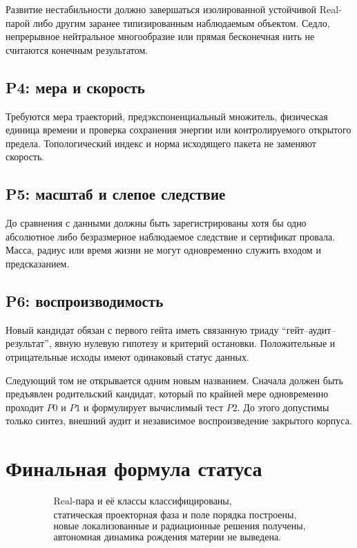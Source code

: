 Развитие нестабильности должно завершаться изолированной устойчивой
Real-парой либо другим заранее типизированным наблюдаемым объектом. Седло,
непрерывное нейтральное многообразие или прямая бесконечная нить не
считаются конечным результатом.

\subsection*{P4: мера и скорость}

Требуются мера траекторий, предэкспоненциальный множитель, физическая
единица времени и проверка сохранения энергии или контролируемого
открытого предела. Топологический индекс и норма исходящего пакета не
заменяют скорость.

\subsection*{P5: масштаб и слепое следствие}

До сравнения с данными должны быть зарегистрированы хотя бы одно
абсолютное либо безразмерное наблюдаемое следствие и сертификат провала.
Масса, радиус или время жизни не могут одновременно служить входом и
предсказанием.

\subsection*{P6: воспроизводимость}

Новый кандидат обязан с первого гейта иметь связанную триаду
``гейт--аудит--результат'', явную нулевую гипотезу и критерий остановки.
Положительные и отрицательные исходы имеют одинаковый статус данных.

\begin{nogocriterion}
Следующий том не открывается одним новым названием. Сначала должен быть
предъявлен родительский кандидат, который по крайней мере одновременно
проходит $P0$ и $P1$ и формулирует вычислимый тест $P2$. До этого
допустимы только синтез, внешний аудит и независимое воспроизведение
закрытого корпуса.
\end{nogocriterion}

\section{Финальная формула статуса}

\begin{equation}
 \boxed{
 \begin{gathered}
 \text{Real-пара и её классы классифицированы,}\\
 \text{статическая проекторная фаза и поле порядка построены,}\\
 \text{новые локализованные и радиационные решения получены,}\\
 \text{автономная динамика рождения материи не выведена.}
 \end{gathered}}
 \label{eq:v6-final-status-box}
\end{equation}

